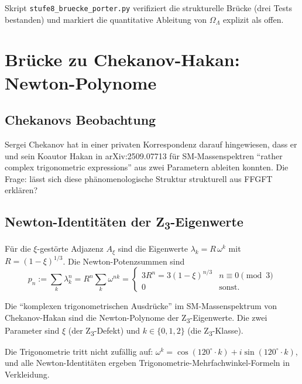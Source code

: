 Skript \texttt{stufe8\_bruecke\_porter.py} verifiziert die strukturelle Brücke (drei Tests bestanden) und markiert die quantitative Ableitung von \(\Omega_\Lambda\) explizit als offen.

\section{Brücke zu Chekanov-Hakan: Newton-Polynome}
\label{sec:chekanov}

\subsection{Chekanovs Beobachtung}

Sergei Chekanov hat in einer privaten Korrespondenz darauf hingewiesen, dass er und sein Koautor Hakan in arXiv:2509.07713 für SM-Massenspektren ``rather complex trigonometric expressions'' aus zwei Parametern ableiten konnten. Die Frage: lässt sich diese phänomenologische Struktur strukturell aus FFGFT erklären?

\subsection{Newton-Identitäten der Z\textsubscript{3}-Eigenwerte}

Für die \(\xi\)-gestörte Adjazenz \(A_\xi\) sind die Eigenwerte \(\lambda_k = R\,\omega^k\) mit \(R = (1-\xi)^{1/3}\). Die Newton-Potenzsummen sind
\begin{equation}
p_n := \sum_k \lambda_k^n = R^n \sum_k \omega^{nk} = \begin{cases} 3 R^n = 3 (1-\xi)^{n/3} & n \equiv 0 \pmod 3 \\ 0 & \text{sonst.} \end{cases}
\end{equation}

\begin{keyresult}
Die ``komplexen trigonometrischen Ausdrücke'' im SM-Massenspektrum von Chekanov-Hakan sind die Newton-Polynome der Z\textsubscript{3}-Eigenwerte. Die zwei Parameter sind \(\xi\) (der Z\textsubscript{3}-Defekt) und \(k \in \{0, 1, 2\}\) (die Z\textsubscript{3}-Klasse).
\end{keyresult}

Die Trigonometrie tritt nicht zufällig auf: \(\omega^k = \cos(120^\circ \cdot k) + i \sin(120^\circ \cdot k)\), und alle Newton-Identitäten ergeben Trigonometrie-Mehrfachwinkel-Formeln in Verkleidung.

